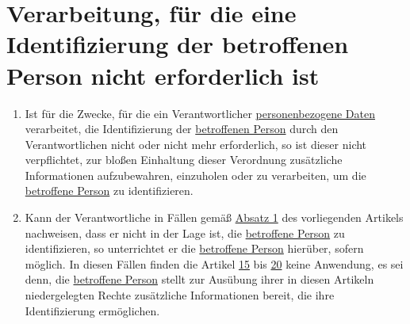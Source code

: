 \chapter{Verarbeitung, für die eine Identifizierung der betroffenen Person nicht erforderlich ist}
\label{ch:11}


\begin{enumerate}

  \item Ist für die Zwecke, für die ein Verantwortlicher \hyperref[itm:04-1]{personenbezogene Daten} verarbeitet, die Identifizierung der
   \hyperref[itm:04-1]{betroffenen Person} durch den Verantwortlichen nicht oder nicht mehr erforderlich, so ist dieser nicht verpflichtet,
   zur bloßen Einhaltung dieser Verordnung zusätzliche Informationen aufzubewahren, einzuholen oder zu verarbeiten, um
   die \hyperref[itm:04-1]{betroffene Person} zu identifizieren.
  \label{itm:11-1}

  \item Kann der Verantwortliche in Fällen gemäß \hyperref[itm:11-1]{Absatz 1} des vorliegenden Artikels nachweisen,
   dass er nicht in der Lage ist, die \hyperref[itm:04-1]{betroffene Person} zu identifizieren, so unterrichtet er die \hyperref[itm:04-1]{betroffene Person}
   hierüber, sofern möglich. In diesen Fällen finden die Artikel \hyperref[ch:15]{15} bis \hyperref[ch:20]{20} keine
   Anwendung, es sei denn, die \hyperref[itm:04-1]{betroffene Person} stellt zur Ausübung ihrer in diesen Artikeln niedergelegten Rechte
   zusätzliche Informationen bereit, die ihre Identifizierung ermöglichen.
  \label{itm:11-2}

\end{enumerate}


